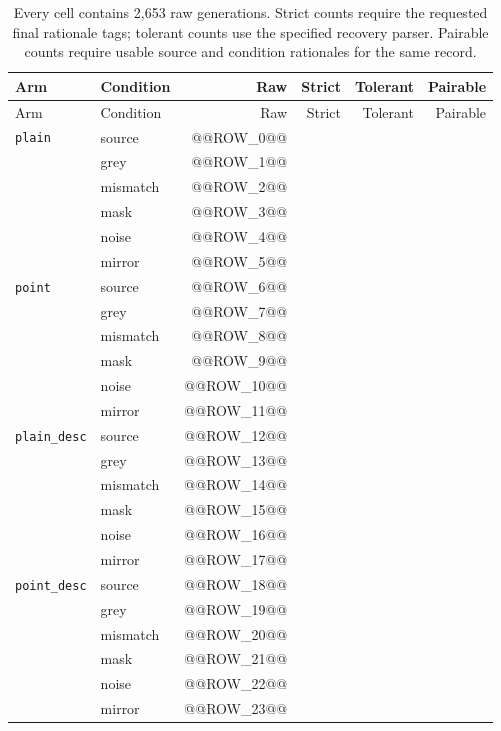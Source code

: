 \begin{longtable}{llrrrr}
\caption[Complete Stage~2 parse coverage]{Every cell contains 2,653 raw
generations. Strict counts require the requested final rationale tags; tolerant
counts use the specified recovery parser. Pairable counts require usable source
and condition rationales for the same record.}\label{tab:app-rq2-coverage}\\
\toprule
Arm & Condition & Raw & Strict & Tolerant & Pairable \\
\midrule
\endfirsthead
\toprule
Arm & Condition & Raw & Strict & Tolerant & Pairable \\
\midrule
\endhead
\texttt{plain} & source & @@ROW_0@@ \\
 & grey & @@ROW_1@@ \\
 & mismatch & @@ROW_2@@ \\
 & mask & @@ROW_3@@ \\
 & noise & @@ROW_4@@ \\
 & mirror & @@ROW_5@@ \\
\texttt{point} & source & @@ROW_6@@ \\
 & grey & @@ROW_7@@ \\
 & mismatch & @@ROW_8@@ \\
 & mask & @@ROW_9@@ \\
 & noise & @@ROW_10@@ \\
 & mirror & @@ROW_11@@ \\
\texttt{plain\_desc} & source & @@ROW_12@@ \\
 & grey & @@ROW_13@@ \\
 & mismatch & @@ROW_14@@ \\
 & mask & @@ROW_15@@ \\
 & noise & @@ROW_16@@ \\
 & mirror & @@ROW_17@@ \\
\texttt{point\_desc} & source & @@ROW_18@@ \\
 & grey & @@ROW_19@@ \\
 & mismatch & @@ROW_20@@ \\
 & mask & @@ROW_21@@ \\
 & noise & @@ROW_22@@ \\
 & mirror & @@ROW_23@@ \\
\bottomrule
\end{longtable}
